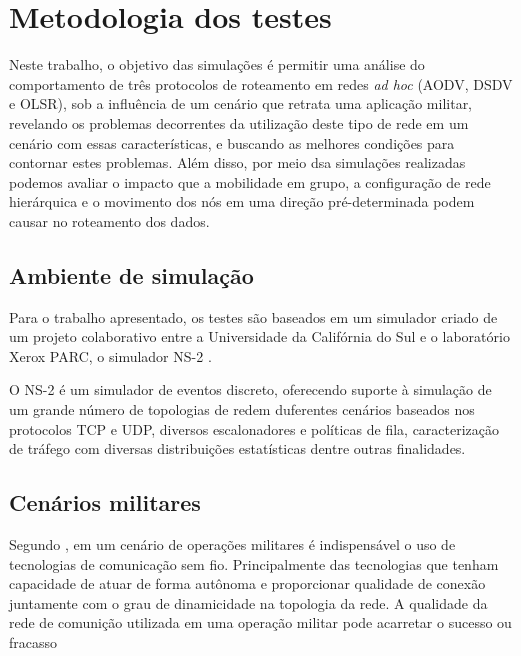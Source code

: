 \section{Metodologia dos testes} 
Neste trabalho, o objetivo das simula\c{c}\~oes \'e permitir uma an\'alise do comportamento de tr\^es protocolos de roteamento em redes \textit{ad hoc} (AODV, DSDV e OLSR), sob a influ\^encia de um cen\'ario que retrata uma aplica\c{c}\~ao militar, revelando os problemas decorrentes da utiliza\c{c}\~ao deste tipo de rede em um cen\'ario com essas caracter\'isticas, e buscando as melhores condi\c{c}\~oes para contornar estes problemas. Al\'em disso, por meio dsa simula\c{c}\~oes realizadas podemos avaliar o impacto que a mobilidade em grupo, a configura\c{c}\~ao de rede hier\'arquica e o movimento dos n\'os em uma dire\c{c}\~ao pr\'e-determinada podem causar no roteamento dos dados.

\subsection{Ambiente de simula\c{c}\~ ao}
Para o trabalho apresentado, os testes s\~ao baseados em um simulador criado de um projeto colaborativo entre a Universidade da Calif\'ornia do Sul e o laborat\'orio Xerox PARC, o simulador NS-2 \cite{FallVaradhan}.

O NS-2 \'e um simulador de eventos discreto, oferecendo suporte \`a simula\c{c}\~ao de um grande n\'umero de topologias de redem duferentes cen\'arios baseados nos protocolos TCP e UDP, diversos escalonadores e pol\'iticas de fila, caracteriza\c{c}\~ao de tr\'afego com diversas distribui\c{c}\~oes estat\'isticas dentre outras finalidades.


\subsection{Cen\'arios militares}
Segundo \cite{pereira}, em um cen\'ario de opera\c{c}\~oes militares \'e indispens\'avel o uso de tecnologias de comunica\c{c}\~ao sem fio. 
Principalmente das tecnologias que tenham capacidade de atuar de forma aut\^onoma e proporcionar qualidade de conex\~ao juntamente com o grau de dinamicidade na topologia da rede.
A qualidade da rede de comuni\c{c}\~ao utilizada em uma opera\c{c}\~ao militar pode acarretar o sucesso ou fracasso 

